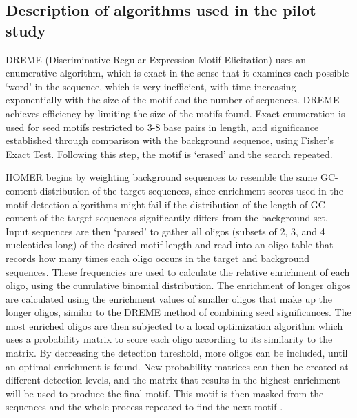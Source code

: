 \documentclass[12pt]{article}
\begin{document}
\begin{appendices}
\section{Description of algorithms used in the pilot study}
DREME (Discriminative Regular Expression Motif Elicitation) \citep{bailey2011dreme} uses an enumerative algorithm, which is exact in the sense that it examines each possible `word' in the sequence, which is very inefficient, with time increasing exponentially with the size of the motif and the number of sequences. DREME achieves efficiency by limiting the size of the motifs found. Exact enumeration is used for seed motifs restricted to 3-8 base pairs in length, and significance established through comparison with the background sequence, using Fisher's Exact Test. Following this step, the motif is `erased' and the search repeated.
 
HOMER \citep{heinz2010simple} begins by weighting background sequences to resemble the same GC-content distribution of the target sequences, since enrichment scores used in the motif detection algorithms might fail if the distribution of the length of GC content of the target sequences significantly
differs from the background set. Input sequences are then `parsed' to gather all oligos (subsets of 2, 3, and 4 nucleotides long) of the desired motif length and read into an oligo table that records how many times each oligo occurs in the target and background sequences. These frequencies are used to calculate the relative enrichment of each oligo, using the cumulative binomial distribution. The enrichment of longer oligos are calculated using the enrichment values of smaller oligos that make up the longer oligos, similar to the DREME method of combining seed significances. The most enriched oligos are then subjected to a local optimization algorithm which uses a probability matrix to score each oligo according to its similarity to the matrix. By decreasing the detection threshold, more oligos can be included, until an optimal enrichment is found. New probability matrices can then be created at different detection levels, and the matrix that results in the highest enrichment will be used to produce the final motif. This motif is then masked from the sequences and the whole process repeated to find the next motif \citep{homer_ws}.


\end{appendices}
\end{document}
